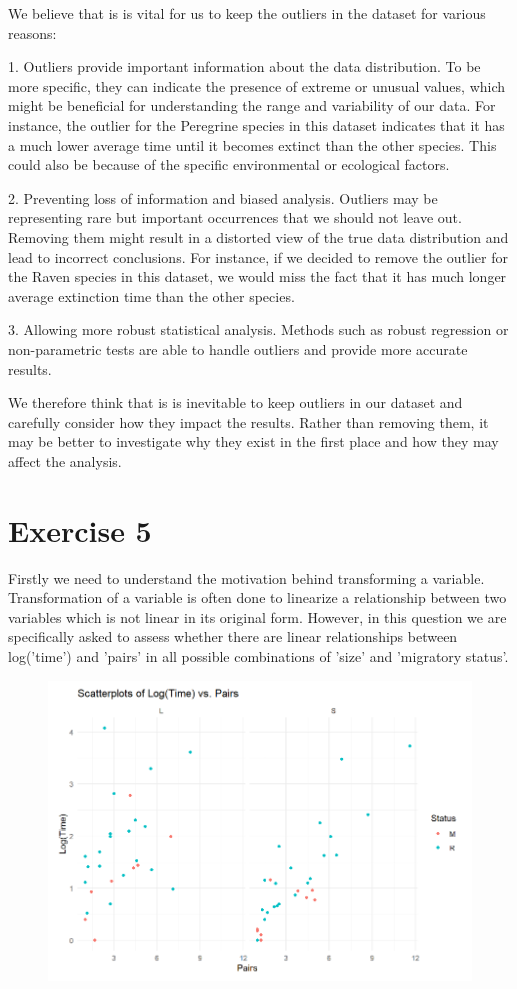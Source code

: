 \documentclass{article}
\begin{document}
We believe that is is vital for us to keep the outliers in the dataset for various reasons:

1. Outliers provide important information about the data distribution. To be more specific, they can indicate the presence of extreme or unusual values, which might be beneficial for understanding the range and variability of our data. For instance,  the outlier for the Peregrine species in this dataset indicates that it has a much lower average time until it becomes extinct than the other species. This could also be because of the specific environmental or ecological factors.

2. Preventing loss of information and biased analysis. Outliers may be representing rare but important occurrences that we should not leave out. Removing them might result in a distorted view of the true data distribution and lead to incorrect conclusions. For instance, if we decided to remove the outlier for the Raven species in this dataset, we would miss the fact that it has much longer average extinction time than the other species.

3. Allowing more robust statistical analysis. Methods such as robust regression or non-parametric tests are able to handle outliers and provide more accurate results.

We therefore think that is is inevitable to keep outliers in our dataset and carefully consider how they impact the results. Rather than removing them, it may be better to investigate why they exist in the first place and how they may affect the analysis.


\section{Exercise 5}
Firstly we need to understand the motivation behind transforming a variable. Transformation of a variable is often done to linearize a relationship between two variables which is not linear in its original form. However, in this question we are specifically asked to assess whether there are linear relationships between log('time') and 'pairs' in all possible combinations of 'size' and 'migratory status'.

\begin{figure}
    \includegraphics[width=\linewidth]{graphs/graph5.png}
\end{figure}
\end{document}
